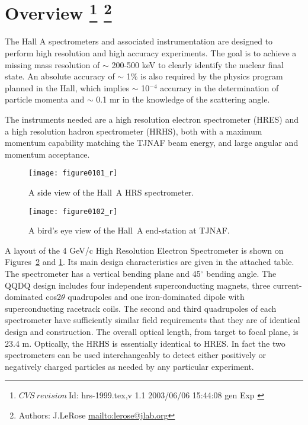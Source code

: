 \section[Overview]{Overview
\footnote{
  $CVS~revision~ $Id: hrs-1999.tex,v 1.1 2003/06/06 15:44:08 gen Exp $ $ 
}
\footnote{Authors: J.LeRose \url{mailto:lerose@jlab.org}}
}
   
The Hall A spectrometers and associated instrumentation are designed to 
perform high resolution and high accuracy experiments.  The goal is to 
achieve a missing mass resolution of $\sim$ 200-500 keV to clearly 
identify the nuclear final state.  An absolute accuracy of $\sim$ 1\% is 
also required by the physics program planned in the Hall, which implies 
$\sim$ 10$^{-4}$ accuracy in the determination of particle momenta and 
$\sim$ 0.1 mr in the knowledge of the scattering angle.

The instruments needed are a high resolution electron spectrometer 
(HRES) and a high resolution hadron spectrometer (HRHS), both with a 
maximum momentum capability matching the TJNAF beam energy, and large 
angular and momentum acceptance.

\begin{figure}[tbp]
\begin{center}
\texttt{[image: figure0101\_r]}
{\linespread{1.}
\caption[Spectrometers: Elevation View of Hall~A HRS]{A side view of the Hall~A
HRS spectrometer.}  
\label{fig:hrs_ev}}
\end{center}
\end{figure}
 
\begin{figure}[tbp]
\begin{center}
\texttt{[image: figure0102\_r]}
{\linespread{1.}
\caption[Spectrometers: Plan View of Hall~A]{A bird's eye view of the Hall~A
end-station at TJNAF.}  
\label{fig:hrs_pv}}
\end{center}
\end{figure}


A layout of the 4 GeV/c High Resolution Electron Spectrometer is shown 
on Figures~\ref{fig:hrs_pv} and \ref{fig:hrs_ev}.
Its main design characteristics are 
given in the attached table.  The spectrometer has a vertical bending 
plane and 45$^{\circ}$ bending angle.  The QQDQ design includes four 
independent superconducting magnets, three current-dominated 
cos2$\theta$ quadrupoles and one iron-dominated dipole with 
superconducting racetrack coils.  The second and third quadrupoles of 
each spectrometer have sufficiently similar field requirements that they 
are of identical design and construction.  The overall optical length, 
from target to focal plane, is 23.4 m.  Optically, the HRHS 
is essentially identical to HRES. In fact the two spectrometers can be used 
interchangeably to detect either positively or negatively charged particles 
as needed by any particular experiment. 

